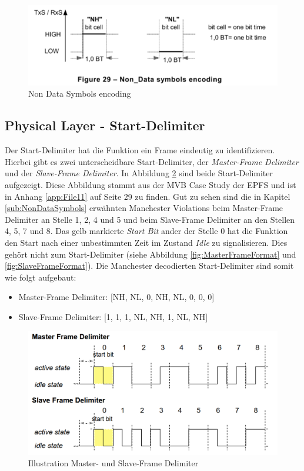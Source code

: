 \begin{figure}[H]
    \centering
    \includegraphics[width = 0.7 \textwidth]{Figures/Chap2/Grundlagen/MVB_DOKU/Layer/Non_Data_Symbol.png}
    \caption{Non Data Symbols encoding}
    \label{fig:NonDataSymbolsEncoding}
\end{figure}

\subsection{Physical Layer - Start-Delimiter}
\label{sub:StartDelimiter}
Der Start-Delimiter hat die Funktion ein Frame eindeutig zu identifizieren. Hierbei gibt es zwei unterscheidbare Start-Delimiter, der \textit{Master-Frame Delimiter} und der \textit{Slave-Frame Delimiter}. In Abbildung \ref{fig:FrameDelimiterMasterSlave} sind beide Start-Delimiter aufgezeigt. Diese Abbildung stammt aus der MVB Case Study der EPFS und ist in Anhang \ref{app:File11} auf Seite 29 zu finden. Gut zu sehen sind die in Kapitel \ref{sub:NonDataSymbols} erwähnten Manchester Violations beim Master-Frame Delimiter an Stelle 1, 2, 4 und 5 und beim Slave-Frame Delimiter an den Stellen 4, 5, 7 und 8. Das gelb markierte \textit{Start Bit} ander der Stelle 0 hat die Funktion den Start nach einer unbestimmten Zeit im Zustand \textit{Idle} zu signalisieren. Dies gehört nicht zum Start-Delimiter (siehe Abbildung \ref{fig:MasterFrameFormat} und \ref{fig:SlaveFrameFormat}). Die Manchester decodierten Start-Delimiter sind somit wie folgt aufgebaut:

\begin{itemize}
    \item Master-Frame Delimiter: [NH, NL, 0, NH, NL, 0, 0, 0]
    \item Slave-Frame Delimiter: [1, 1, 1, NL, NH, 1, NL, NH]
\end{itemize}


\begin{figure}[H]
    \centering
    \includegraphics[width=0.8\linewidth]{Figures/Chap2/Grundlagen/MVB_DOKU/Layer/Frame_Delimiter.png}
    \caption{Illustration Master- und Slave-Frame Delimiter}
    \label{fig:FrameDelimiterMasterSlave}
\end{figure}


